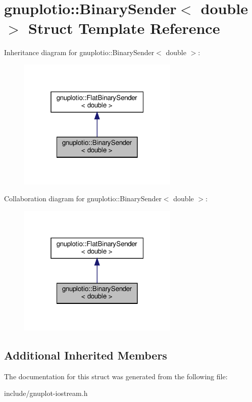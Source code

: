 \hypertarget{structgnuplotio_1_1BinarySender_3_01double_01_4}{}\section{gnuplotio\+:\+:Binary\+Sender$<$ double $>$ Struct Template Reference}
\label{structgnuplotio_1_1BinarySender_3_01double_01_4}


Inheritance diagram for gnuplotio\+:\+:Binary\+Sender$<$ double $>$\+:\nopagebreak
\begin{figure}[H]
\begin{center}
\leavevmode
\includegraphics[width=217pt]{structgnuplotio_1_1BinarySender_3_01double_01_4__inherit__graph}
\end{center}
\end{figure}


Collaboration diagram for gnuplotio\+:\+:Binary\+Sender$<$ double $>$\+:\nopagebreak
\begin{figure}[H]
\begin{center}
\leavevmode
\includegraphics[width=217pt]{structgnuplotio_1_1BinarySender_3_01double_01_4__coll__graph}
\end{center}
\end{figure}
\subsection*{Additional Inherited Members}


The documentation for this struct was generated from the following file\+:\begin{DoxyCompactItemize}
\item 
include/gnuplot-\/iostream.\+h\end{DoxyCompactItemize}
